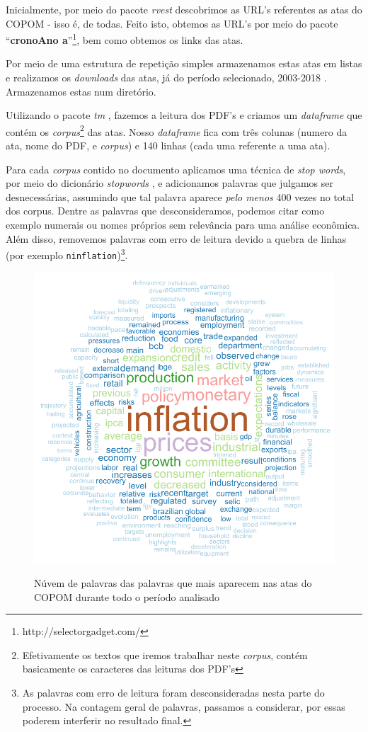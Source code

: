
Inicialmente, por meio do pacote \textit{rvest} \cite{rvest} descobrimos as URL's referentes as atas do COPOM - isso é, de todas. Feito isto, obtemos as URL's por meio do pacote ``\textbf{cronoAno a}''\footnote{http://selectorgadget.com/}, bem como obtemos os links das atas.

Por meio de uma estrutura de repetição simples armazenamos estas atas em listas e realizamos os \textit{downloads} das atas, já do período selecionado, 2003-2018 . Armazenamos estas num diretório.

Utilizando o pacote \textit{tm} \cite{tm}, fazemos a leitura dos PDF's e criamos um \textit{dataframe} que contém os \textit{corpus}\footnote{Efetivamente os textos que iremos trabalhar neste \textit{corpus}, contém basicamente os caracteres das leituras dos PDF's} das atas. Nosso \textit{dataframe} fica com três colunas (numero da ata, nome do PDF, e \textit{corpus}) e 140 linhas (cada uma referente a uma ata). 

Para cada \textit{corpus} contido no documento aplicamos uma técnica de \textit{stop words}, por meio do dicionário \textit{stopwords} \cite{tidystop}, e adicionamos palavras que julgamos ser desnecessárias, assumindo que tal palavra aparece \textit{pelo menos} 400 vezes no total dos corpus. Dentre as palavras que desconsideramos, podemos citar como exemplo numerais ou nomes próprios sem relevância para uma análise econômica. Além disso, removemos palavras com erro de leitura devido a quebra de linhas (por exemplo \texttt{ninflation})\footnote{As palavras com erro de leitura foram desconsideradas nesta parte do processo. Na contagem geral de palavras, passamos a considerar, por essas poderem interferir no resultado final.}.
\begin{figure}[!h]
    \centering
    \caption{Núvem de palavras das palavras que mais aparecem nas atas do COPOM durante todo o período analisado}
    \includegraphics[width=.8\textwidth]{capitulos/figures/wordcloud.pdf}
    \label{fig:wc01}
\end{figure}

